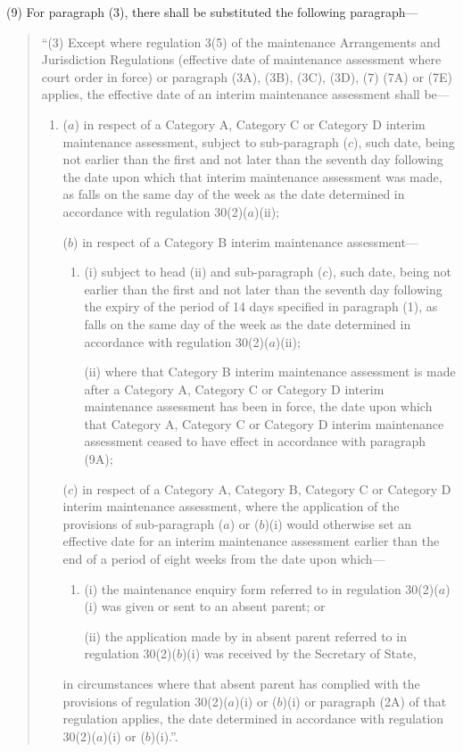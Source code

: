 \documentclass[a4paper]{article}
\begin{document}
(9) For paragraph (3), there shall be substituted the following paragraph—
\begin{quotation}
“(3) Except where regulation 3(5) of the maintenance Arrangements and Jurisdiction Regulations (effective date of maintenance assessment where court order in force) or paragraph (3A), (3B), (3C), (3D), (7) (7A) or (7E) applies, the effective date of an interim maintenance assessment shall be—
\begin{enumerate}\item[]
($a$) in respect of a Category A, Category C or Category D interim maintenance assessment, subject to sub-paragraph ($c$), such date, being not earlier than the first and not later than the seventh day following the date upon which that interim maintenance assessment was made, as falls on the same day of the week as the date determined in accordance with regulation 30(2)($a$)(ii);

($b$) in respect of a Category B interim maintenance assessment—
\begin{enumerate}\item[]
(i) subject to head (ii) and sub-paragraph ($c$), such date, being not earlier than the first and not later than the seventh day following the expiry of the period of 14 days specified in paragraph (1), as falls on the same day of the week as the date determined in accordance with regulation 30(2)($a$)(ii);

(ii) where that Category B interim maintenance assessment is made after a Category A, Category C or Category D interim maintenance assessment has been in force, the date upon which that Category A, Category C or Category D interim maintenance assessment ceased to have effect in accordance with paragraph (9A);
\end{enumerate}

($c$) in respect of a Category A, Category B, Category C or Category D interim maintenance assessment, where the application of the provisions of sub-paragraph ($a$) or ($b$)(i) would otherwise set an effective date for an interim maintenance assessment earlier than the end of a period of eight weeks from the date upon which—
\begin{enumerate}\item[]
(i) the maintenance enquiry form referred to in regulation 30(2)($a$)(i) was given or sent to an absent parent; or

(ii) the application made by in absent parent referred to in regulation 30(2)($b$)(i) was received by the Secretary of State,
\end{enumerate}
in circumstances where that absent parent has complied with the provisions of regulation 30(2)($a$)(i) or ($b$)(i) or paragraph (2A) of that regulation applies, the date determined in accordance with regulation 30(2)($a$)(i) or ($b$)(i).”.
\end{enumerate}
\end{quotation}
\end{document}
